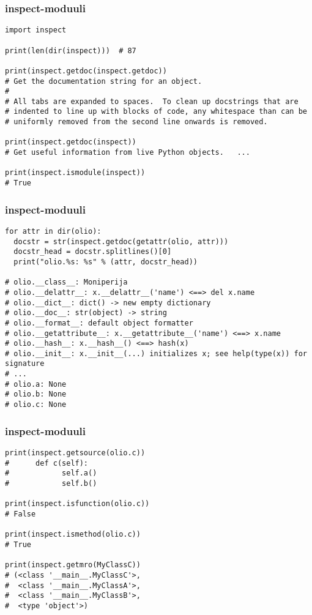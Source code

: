 \documentclass{beamer}
\begin{document}
\begin{frame}[fragile]
\frametitle{inspect-moduuli}
\begin{verbatim}
import inspect

print(len(dir(inspect)))  # 87

print(inspect.getdoc(inspect.getdoc))
# Get the documentation string for an object.
# 
# All tabs are expanded to spaces.  To clean up docstrings that are
# indented to line up with blocks of code, any whitespace than can be
# uniformly removed from the second line onwards is removed.

print(inspect.getdoc(inspect))
# Get useful information from live Python objects.   ...

print(inspect.ismodule(inspect))
# True

\end{verbatim}
\end{frame}

\begin{frame}[fragile]
\frametitle{inspect-moduuli}
\begin{verbatim}
for attr in dir(olio):
  docstr = str(inspect.getdoc(getattr(olio, attr)))
  docstr_head = docstr.splitlines()[0]
  print("olio.%s: %s" % (attr, docstr_head))

# olio.__class__: Moniperija
# olio.__delattr__: x.__delattr__('name') <==> del x.name
# olio.__dict__: dict() -> new empty dictionary
# olio.__doc__: str(object) -> string
# olio.__format__: default object formatter
# olio.__getattribute__: x.__getattribute__('name') <==> x.name
# olio.__hash__: x.__hash__() <==> hash(x)
# olio.__init__: x.__init__(...) initializes x; see help(type(x)) for signature
# ...
# olio.a: None
# olio.b: None
# olio.c: None

\end{verbatim}
\end{frame}

\begin{frame}[fragile]
\frametitle{inspect-moduuli}
\begin{verbatim}
print(inspect.getsource(olio.c))
#      def c(self):
#            self.a()
#            self.b()

print(inspect.isfunction(olio.c))
# False

print(inspect.ismethod(olio.c))
# True

print(inspect.getmro(MyClassC))
# (<class '__main__.MyClassC'>, 
#  <class '__main__.MyClassA'>, 
#  <class '__main__.MyClassB'>, 
#  <type 'object'>)

\end{verbatim}
\end{frame}
\end{document}
